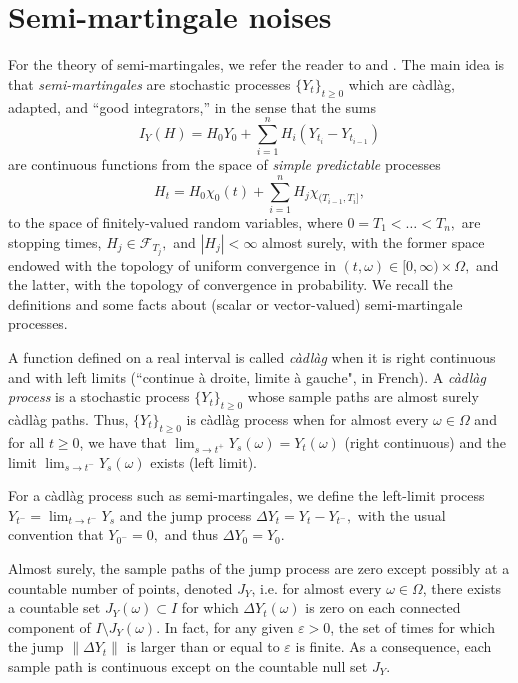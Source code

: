 \documentclass[reqno,12pt]{amsart}
\theoremstyle{plain} %
\theoremstyle{definition} %
\begin{document}
\section{Semi-martingale noises}
\label{secsemimartingale}

For the theory of semi-martingales, we refer the reader to \cite{Protter2005} and \cite{Metivier1982}. The main idea is that \emph{semi-martingales} are stochastic processes $\{Y_t\}_{t\geq 0}$ which are c\`adl\`ag, adapted, and ``good integrators,'' in the sense that the sums
\[
    I_Y(H) = H_0 Y_0 + \sum_{i=1}^n H_i(Y_{t_i}-Y_{t_{i-1}})
\]
are continuous functions from the space of \emph{simple predictable} processes
\[
    H_t = H_0 \chi_{0}(t) + \sum_{i=1}^n H_j \chi_{(T_{i-1}, T_i]},
\]
to the space of finitely-valued random variables, where $0=T_1 < \ldots < T_n,$ are stopping times, $H_j \in \mathcal{F}_{T_j},$ and $|H_j| < \infty$ almost surely, with the former space endowed with the topology of uniform convergence in $(t, \omega)\in [0,\infty)\times \Omega,$ and the latter, with the topology of convergence in probability. We recall the definitions and some facts about (scalar or vector-valued) semi-martingale processes.

A function defined on a real interval is called \emph{c\`adl\`ag} when it is right continuous and with left limits (``continue \`a droite, limite \`a gauche", in French). A \emph{c\`adl\`ag process} is a stochastic process $\{Y_t\}_{t\geq 0}$ whose sample paths are almost surely c\`adl\`ag paths. Thus, $\{Y_t\}_{t\geq 0}$ is c\`adl\`ag process when for almost every $\omega\in \Omega$ and for all $t\geq 0$, we have that $\lim_{s\rightarrow t^+} Y_s(\omega) = Y_t(\omega)$ (right continuous) and the limit $\lim_{s \rightarrow t^-} Y_s(\omega)$ exists (left limit).

For a c\`adl\`ag process such as semi-martingales, we define the left-limit process $Y_{t^{-}} = \lim_{t \rightarrow t^-} Y_s$ and the jump process $\Delta Y_t = Y_t - Y_{t^{-}},$ with the usual convention that $Y_{0^-} = 0,$ and thus $\Delta Y_0 = Y_0.$

Almost surely, the sample paths of the jump process are zero except possibly at a countable number of points, denoted $J_{Y}$, i.e. for almost every $\omega\in \Omega$, there exists a countable set $J_{Y}(\omega) \subset I$ for which $\Delta Y_t(\omega)$ is zero on each connected component of $I\setminus J_{Y}(\omega)$. In fact, for any given $\varepsilon > 0$, the set of times for which the jump $\|\Delta Y_t\|$ is larger than or equal to $\varepsilon$ is finite. As a consequence, each sample path is continuous except on the countable null set $J_{Y}.$
\end{document}
